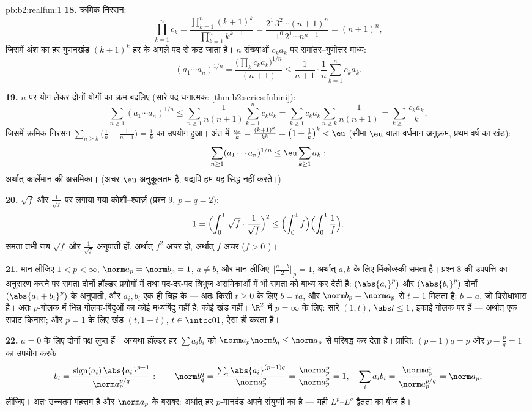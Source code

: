 \begin{solution}{pb:b2:realfun:1}
\textbf{18.} क्रमिक निरसन:
\[
\prod_{k=1}^{n}c_k = \frac{\prod_{k=1}^n(k+1)^k}
{\prod_{k=1}^{n}k^{k-1}}
= \frac{2^1\,3^2\cdots(n+1)^n}{1^0\,2^1\cdots n^{n-1}}
= (n+1)^n,
\]
जिसमें अंश का हर गुणनखंड $(k+1)^k$ हर के अगले पद से कट जाता है। $n$ संख्याओं
$c_ka_k$ पर समांतर--गुणोत्तर माध्य:
\[
(a_1\cdots a_n)^{1/n} =
\frac{\bigl(\prod_k c_ka_k\bigr)^{1/n}}{(n+1)}
\leq \frac{1}{n+1}\cdot\frac1n\sum_{k=1}^{n}c_ka_k .
\]

\textbf{19.} $n$ पर योग लेकर दोनों योगों का क्रम बदलिए (सारे पद धनात्मक:
\cref{thm:b2:series:fubini}):
\[
\sum_{n\geq1}(a_1\cdots a_n)^{1/n}
\leq \sum_{n\geq1}\frac{1}{n(n+1)}\sum_{k=1}^{n}c_ka_k
= \sum_{k\geq1}c_ka_k\sum_{n\geq k}\frac1{n(n+1)}
= \sum_{k\geq1}\frac{c_ka_k}{k},
\]
जिसमें क्रमिक निरसन $\sum_{n\geq k}\bigl(\frac1n -
\frac1{n+1}\bigr) = \frac1k$ का उपयोग हुआ। अंत में $\frac{c_k}k =
\frac{(k+1)^k}{k^k} = \bigl(1 + \frac1k\bigr)^k < \eu$ (सीमा $\eu$ वाला वर्धमान
अनुक्रम, प्रथम वर्ष का खंड):
\[
\sum_{n\geq1}(a_1\cdots a_n)^{1/n} \leq
\eu\sum_{k\geq1}a_k :
\]
अर्थात् कार्लेमान की असमिका। (अचर $\eu$ अनुकूलतम है, यद्यपि हम यह सिद्ध
नहीं करते।)

\textbf{20.} $\sqrt f$ और $\frac1{\sqrt f}$ पर लगाया गया कोशी--श्वार्ज़ (प्रश्न 9, $p = q = 2$):
\[
1 = \Bigl(\int_0^1\sqrt f\cdot\frac{1}{\sqrt f}\Bigr)^{2}
\leq \Bigl(\int_0^1 f\Bigr)\Bigl(\int_0^1\frac1f\Bigr).
\]
समता तभी जब $\sqrt f$ और $\frac1{\sqrt f}$ अनुपाती हों, अर्थात् $f^2$ अचर हो, अर्थात् $f$ अचर
($f > 0$ )।

\textbf{21.} मान लीजिए $1 < p < \infty$, $\norm a_p = \norm b_p = 1$, $a \neq b$, और मान लीजिए $\bigl\Vert\frac{a+b}2\bigr\Vert_p = 1$, अर्थात् $a, b$ के
लिए मिंकोव्स्की समता है। प्रश्न 8 की उपपत्ति का अनुसरण करने पर समता
दोनों हॉल्डर प्रयोगों में तथा पद-दर-पद त्रिभुज असमिकाओं में भी समता को
बाध्य कर देती है: $(\abs{a_i}^p)$ और $(\abs{b_i}^p)$ दोनों $(\abs{a_i + b_i}^p)$ के अनुपाती, और $a_i, b_i$ एक ही चिह्न के
--- अतः किसी $t \geq
0$ के लिए $b = ta$, और $\norm b_p = \norm a_p$ से $t = 1$ मिलता है: $b = a$, जो
विरोधाभास है। अतः $p$-गोलक में भिन्न गोलक-बिंदुओं का कोई मध्यबिंदु नहीं
है: कोई खंड नहीं। $\R^2$ में $p = \infty$ के लिए: सारे $(1, t)$, $\abs t \leq 1$, इकाई गोलक पर
हैं --- अर्थात् एक सपाट किनारा; और $p = 1$ के लिए खंड $(t, 1 - t)$, $t \in \intcc01$, ऐसा ही
करता है।

\textbf{22.} $a = 0$ के लिए दोनों पक्ष लुप्त हैं। अन्यथा हॉल्डर हर $\sum a_ib_i$ को
$\norm a_p\norm b_q \leq \norm
a_p$ से परिबद्ध कर देता है। प्राप्ति: $(p-1)q = p$ और $p - \frac pq = 1$ का उपयोग करके
\[
b_i = \frac{\operatorname{sign}(a_i)\,\abs{a_i}^{p-1}}
{\norm a_p^{p/q}} :
\qquad
\norm b_q^q = \frac{\sum_i\abs{a_i}^{(p-1)q}}{\norm a_p^{p}}
= \frac{\norm a_p^p}{\norm a_p^p} = 1,
\quad
\sum_ia_ib_i = \frac{\norm a_p^p}{\norm a_p^{p/q}} =
\norm a_p ,
\]
लीजिए। अतः उच्चतम महत्तम है और $\norm a_p$ के बराबर: अर्थात् हर $p$-मानदंड अपने
संयुग्मी का   है --- यही $L^p$--$L^q$ द्वैतता का बीज है।


\end{solution}
